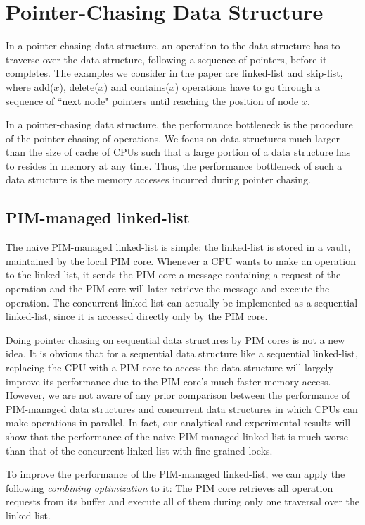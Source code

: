 \documentclass[11pt, letterpaper]{article}   	%
\begin{document}
\section{Pointer-Chasing Data Structure}
\label{section:pointer_chasing}
In a pointer-chasing data structure, an operation to the data structure has to
traverse over the data structure, following a sequence of pointers, before it completes.
The examples we consider in the paper are linked-list and skip-list,
where add($x$), delete($x$) and contains($x$) operations have to go through
a sequence of ``next node" pointers until reaching the position of node $x$.

In a pointer-chasing data structure,
the performance bottleneck is the procedure of the pointer chasing of operations.
We focus on data structures much larger than the size of cache of CPUs
such that a large portion of a data structure has to resides in memory at any time.
Thus, the performance bottleneck of such a data structure is
the memory accesses incurred during pointer chasing.


\subsection{PIM-managed linked-list}
\label{section:linked_list}
The naive PIM-managed linked-list is simple:
the linked-list is stored in a vault, maintained by the local PIM core.
Whenever a CPU wants to make an operation to the linked-list,
it sends the PIM core a message containing a request of the operation
and the PIM core will later retrieve the message and execute the operation.
The concurrent linked-list can actually be implemented
as a sequential linked-list, since it is accessed directly only by the PIM core.

Doing pointer chasing on sequential data structures by PIM cores is not a new idea.
It is obvious that for a sequential data structure like a sequential linked-list,
replacing the CPU with a PIM core to access the data structure will largely improve
its performance due to the PIM core's much faster memory access.
However, we are not aware of any prior comparison between the performance of
PIM-managed data structures and concurrent data structures
in which CPUs can make operations in parallel.
In fact, our analytical and experimental results will show that
the performance of the naive PIM-managed linked-list is much worse than
that of the concurrent linked-list with fine-grained locks\cite{Heller05}.

To improve the performance of the PIM-managed linked-list,
we can apply the following \emph{combining optimization} to it:
The PIM core retrieves all operation requests from its buffer and
execute all of them during only one traversal over the linked-list.
\end{document}
